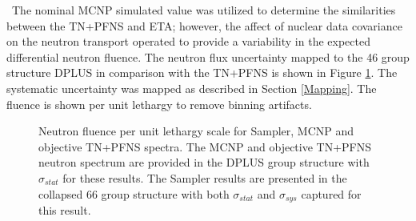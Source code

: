 \ The nominal MCNP simulated value was utilized to determine the similarities between the TN+PFNS and ETA; however, the affect of nuclear data covariance on the neutron transport operated to provide a variability in the expected differential neutron fluence. 
The neutron flux uncertainty mapped to the 46 group structure DPLUS in comparison with the TN+PFNS is shown in Figure \ref{fig:flux31}.
The systematic uncertainty was mapped as described in Section \ref{Mapping}. 
The fluence is shown per unit lethargy to remove binning artifacts.

\begin{figure}[!htbp]
	\centering
	\vfill
	\vfill
	\vfill
	\caption[Neutron fluence per unit lethargy scale for Sampler, MCNP and objective TN+PFNS spectra.]{Neutron fluence per unit lethargy scale for Sampler, MCNP and objective TN+PFNS spectra. The MCNP and objective TN+PFNS neutron spectrum are provided in the DPLUS group structure with  $\sigma_{stat}$ for these results. The Sampler results are presented in the collapsed 66 group structure with both $\sigma_{stat}$ and $\sigma_{sys}$ captured for this result.}
	\label{fig:flux31}
\end{figure}

